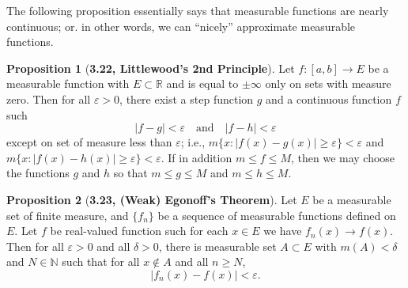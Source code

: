 \documentclass[12pt]{article}
\newcommand{\R}{\mathbb{R}}
\newcommand{\N}{\mathbb{N}}
\renewcommand{\epsilon}{\varepsilon}
\theoremstyle{definition}
\newtheorem*{prop}{Proposition}
\begin{document}
The following proposition essentially says that measurable functions are nearly continuous; or. in other words, we can ``nicely'' approximate measurable functions. 

\begin{prop}[\textbf{3.22, Littlewood's 2nd Principle}]

    Let \( f: [a,b] \to E \) be a measurable function with \( E \subset \R \) and is equal to \( \pm \infty \) only on sets with measure zero. Then for all \( \epsilon > 0 \), there exist a step function \( g \) and a continuous function \( f \) such 
        \[
            |f - g| < \epsilon \quad \text{and} \quad |f - h| < \epsilon  
        \]
    except on set of measure less than \( \epsilon \); i.e., \( m\{x: |f(x) - g(x)| \geq \epsilon\} <  \epsilon \) and \( m\{x: |f(x) - h(x)| \geq \epsilon\} <  \epsilon \). If in addition \( m \leq f \leq M \), then we may choose the functions \( g \) and \( h \) so that \( m \leq g \leq M\) and \( m \leq h \leq M \).
 
\end{prop}

\begin{prop}[\textbf{3.23, (Weak) Egonoff's Theorem}]

    Let \( E \) be a measurable set of finite measure, and \( \{ f_n \} \) be a sequence of measurable functions defined on \( E \). Let \( f \) be real-valued function such for each \( x \in E \) we have \( f_n(x) \to f(x) \). Then for all \( \epsilon > 0 \) and all \( \delta > 0 \), there is measurable set \( A \subset E \) with \( m(A) < \delta \) and \( N \in \N \) such that for all \( x \not\in A \) and all \( n \geq N\),
        \[
            |f_n(x) - f(x)| < \epsilon.    
        \]
    
\end{prop}
\end{document}
